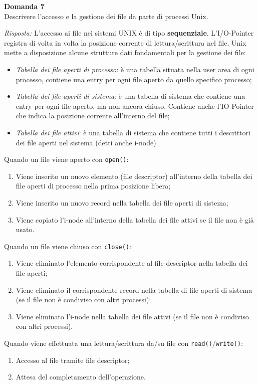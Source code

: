 \documentclass{article}
\newenvironment{problem}[2][Domanda]
    { \begin{mdframed}[backgroundcolor=gray!20] \textbf{#1 #2} \\}
    {  \end{mdframed}}
\newenvironment{solution}
    {\textit{Risposta:}}
    {}
\begin{document}
\begin{problem}{7}
Descrivere l'accesso e la gestione dei file da parte di processi Unix.
\end{problem}
\begin{solution}
L’accesso ai file nei sistemi UNIX è di tipo \textbf{sequenziale}.
L'I/O-Pointer registra di volta in volta la posizione corrente di lettura/scrittura nel file.
\newline
\newline
Unix mette a disposizione alcune strutture dati fondamentali per la gestione dei file:
\begin{itemize}
    \item \emph{Tabella dei file aperti di processo}: è una tabella situata nella user area di ogni processo, contiene una entry per ogni file aperto da quello specifico processo;
    \item \emph{Tabella dei file aperti di sistema}: è una tabella di sistema che contiene una entry per ogni file aperto, ma non ancora chiuso. Contiene anche l’IO-Pointer che indica la posizione corrente all’interno del file;
    \item \emph{Tabella dei file attivi}: è una tabella di sistema che contiene tutti i descrittori dei file aperti nel sistema (detti anche i-node) 
\end{itemize}
Quando un file viene aperto con \texttt{open()}:
\begin{enumerate}
    \item Viene inserito un nuovo elemento (file descriptor) all’interno della tabella dei file aperti di  processo nella prima posizione libera;
    \item Viene inserito un nuovo record nella tabella dei file aperti di sistema;
    \item Viene copiato l’i-node all’interno della tabella dei file attivi se il file non è già usato.
\end{enumerate}
Quando un file viene chiuso con \texttt{close()}:
\begin{enumerate}
    \item Viene eliminato l’elemento corrispondente al file descriptor nella tabella dei file aperti;
    \item Viene eliminato il corrispondente record nella tabella di file aperti di sistema (se il file non è condiviso con altri processi);
    \item Viene eliminato l’i-node nella tabella dei file attivi (se il file non è condiviso con altri processi).
\end{enumerate}
Quando viene effettuata una lettura/scrittura da/su file con \texttt{read()}/\texttt{write()}:
\begin{enumerate}
    \item Accesso al file tramite file descriptor;
    \item Attesa del completamento dell’operazione.
\end{enumerate}
\end{solution}
\end{document}

